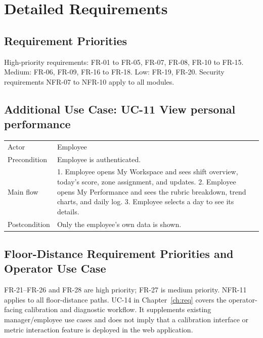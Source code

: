 \chapter{Detailed Requirements}
\section{Requirement Priorities}
High-priority requirements: FR-01 to FR-05, FR-07, FR-08, FR-10 to FR-15. Medium: FR-06, FR-09, FR-16 to FR-18. Low: FR-19, FR-20. Security requirements NFR-07 to NFR-10 apply to all modules.

\section{Additional Use Case: UC-11 View personal performance}
\begin{tabular}{P{0.22\textwidth}P{0.68\textwidth}}
\toprule
Actor & Employee\\
Precondition & Employee is authenticated.\\
Main flow & 1. Employee opens My Workspace and sees shift overview, today's score, zone assignment, and updates. 2. Employee opens My Performance and sees the rubric breakdown, trend charts, and daily log. 3. Employee selects a day to see its details.\\
Postcondition & Only the employee's own data is shown.\\
\bottomrule
\end{tabular}

\section{Floor-Distance Requirement Priorities and Operator Use Case}
FR-21--FR-26 and FR-28 are high priority; FR-27 is medium priority. NFR-11 applies to all floor-distance paths. UC-14 in Chapter~\ref{ch:req} covers the operator-facing calibration and diagnostic workflow. It supplements existing manager/employee use cases and does not imply that a calibration interface or metric interaction feature is deployed in the web application.
